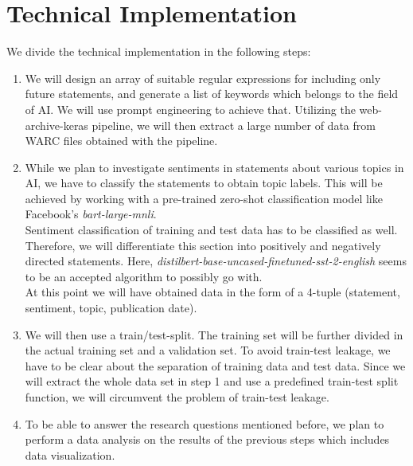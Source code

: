 \documentclass[11pt]{article}
\begin{document}
\section{Technical Implementation}
We divide the technical implementation in the following steps:

\begin{enumerate}
\item We will design an array of suitable regular expressions for including only future statements, and generate a list of keywords which belongs to the field of AI.
We will use prompt engineering to achieve that.
Utilizing the web-archive-keras pipeline, we will then extract a large number of data from WARC files obtained with the pipeline.

\item While we plan to investigate sentiments in statements about various topics in AI, we have to classify the statements to obtain topic labels.
This will be achieved by working with a pre-trained zero-shot classification model like Facebook’s \textit{bart-large-mnli}.
\\
Sentiment classification of training and test data has to be classified as well.
Therefore, we will differentiate this section into positively and negatively directed statements.
Here, \textit{distilbert-base-uncased-finetuned-sst-2-english} seems to be an accepted algorithm to possibly go with.
\\
At this point we will have obtained data in the form of a 4-tuple (statement, sentiment, topic, publication date).

\item We will then use a train/test-split.
The training set will be further divided in the actual training set and a validation set.
To avoid train-test leakage, we have to be clear about the separation of training data and test data.
Since we will extract the whole data set in step 1 and use a predefined train-test split function, we will circumvent the problem of train-test leakage.

\item To be able to answer the research questions mentioned before, we plan to perform a data analysis on the results of the previous steps which includes data visualization.
\end{enumerate}
\end{document}

